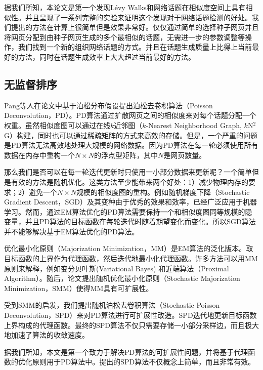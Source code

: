 据我们所知，本论文是第一个发现L\'evy Walks和网络话题在相似度空间上具有相似性。并且呈现了一系列完整的实验来证明这个发现对于网络话题检测的好处。我们提出的方法在计算上很简单但是效果非常好。仅仅通过简单的选择种子网页并且将网页分配到由种子网页生成的多个最相似的话题，无需进一步的参数调整等操作，我们找到一个新的组织网络话题的方式。并且在话题生成质量上比得上当前最好的方法，同时在话题生成效率上大大超过当前最好的方法。



\subsection{无监督排序}

Pang等人在论文\citep{pang-2013-unsupervised}中基于泊松分布假设提出泊松去卷积算法（Poisson Deconvolution，PD）。PD算法通过扩散网页之间的相似度来对每个话题分配一个权重。虽然相似度图可以通过在线$k$近邻图（$k$-Nearest Neighborhood Graph, $k$N$^2$G）\citep{debatty-2016-fastonlineknn}构建，同时也可以通过稀疏矩阵的方式来高效的存储。但是，一个严重的问题是PD算法无法高效地处理大规模的网络数据。因为PD算法在每一轮必须使用所有数据在内存中重构一个$N\times N$的浮点型矩阵，其中$N$是网页数量。

那么我们是否可以在每一轮迭代更新时只使用一小部分数据来更新呢？一个简单但是有效的方法是随机优化\citep{hannah-2015-Stochastic}。这类方法至少能带来两个好处：1）减少物理内存的要求；2）避免一个$N\times N$规模的相似度图的重构。例如随机梯度下降（Stochastic Gradient Descent，SGD）及其变种\citep{Roux-2012-sgd-exponential,johnson-2013-sgd-accelerating,Nitanda-2014-sgd-proximal}由于优秀的效果和效率，已经广泛应用于机器学习。然而，通过EM算法优化的PD算法需要保持一个和相似度图同等规模的隐变量，并且PD算法的目标函数在每轮迭代时随着期望变化而变化。所以SGD算法并不能够解决基于EM算法优化的PD算法。

优化最小化原则（Majorization Minimization，MM）\citep{lange-2000-optimization}是EM算法的泛化版本。取目标函数的上界作为代理函数，然后迭代地最小化代理函数。许多方法可以用MM原则来解释，例如变分贝叶斯(Variational Bayes)
\citep{Wainwright-2008-variational-bayes}和近端算法（Proximal Algorithm）\citep{beck-2009-fastshrinkage}。随后，论文\citep{mairal-2013-SMM}提出随机优化最小化原则（Stochastic Majorization Minimization，SMM）使得MM具有可扩展性。

受到SMM的启发，我们提出随机泊松去卷积算法（Stochastic Poisson Deconvolution，SPD）来对PD算法进行可扩展性改造。SPD迭代地更新目标函数上界构成的代理函数。最终的SPD算法不仅只需要存储一小部分采样边，而且极大地加速了算法的收敛速度。

据我们所知，本文是第一个致力于解决PD算法的可扩展性问题，并将基于代理函数的优化原则用于PD算法中。提出的SPD算法不仅概念上简单，而且非常有效。